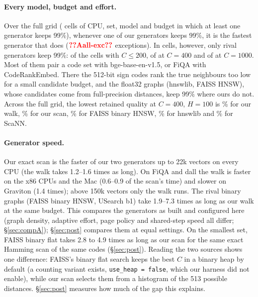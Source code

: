 \paragraph{Every model, budget and effort.} Over the full grid ( cells of CPU, set, model and
budget in which at least one generator keeps 99\%), whenever one of our generators keeps 99\%, it is the
fastest generator that does ($\nm{Aall-exc}$ exceptions). In  cells, however, only rival
generators keep 99\%:  of the  cells with $C \le 200$,  of
 at $C = 400$ and  of  at $C = 1000$. Most of them pair a code
set with bge-base-en-v1.5, or FiQA with CodeRankEmbed. There the 512-bit sign codes rank the true
neighbours too low for a small candidate budget, and the float32 graphs (hnswlib, FAISS HNSW), whose
candidates come from full-precision distances, keep 99\% where ours do not. Across the full grid, the
lowest retained quality at $C = 400$, $H = 100$ is \% for our walk,
\% for our scan, \% for FAISS binary HNSW,
\% for hnswlib and \% for ScaNN.

\paragraph{Generator speed.} Our exact scan is the faster of our two generators up to 22k vectors on
every CPU (the walk takes 1.2--1.6 times as long). On FiQA and dall the walk is faster on the x86 CPUs
and the Mac (0.6--0.9 of the scan's time) and slower on Graviton (1.4 times); above 150k vectors only
the walk runs. The rival binary graphs (FAISS binary HNSW, USearch b1) take 1.9--7.3 times as long as
our walk at the same budget. This compares the generators as built and configured here (graph
density, adaptive effort, page policy and shared-step speed all differ; \S\ref{sec:compA}); \S\ref{sec:post} compares
them at equal settings. On the smallest set, FAISS binary flat takes 2.8 to 4.9 times as long as our scan for the same
exact Hamming scan of the same codes (\S\ref{sec:post}). Reading the two sources shows one difference: FAISS's
binary flat search keeps the best $C$ in a binary heap by default (a counting variant exists, \texttt{use\_heap =
false}, which our harness did not enable), while our scan selects them from a histogram of the 513 possible distances.
\S\ref{sec:post} measures how much of the gap this explains.

